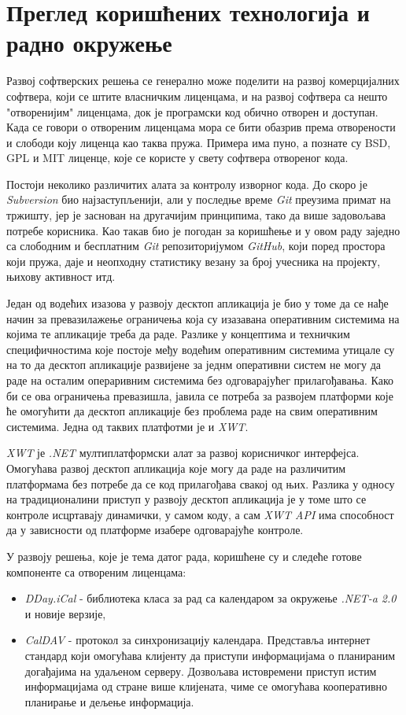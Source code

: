 \chapter{Преглед коришћених технологија и радно окружење}
\label{chap:Pregled koriscenih tehnologija}

Развој софтверских решења се генерално може поделити на развој комерцијалних софтвера, који се штите власничким лиценцама, и на развој софтвера са нешто "отворенијим" лиценцама, док је програмски код обично отворен и доступан. Када се говори о отвореним лиценцама мора се бити обазрив према отворености и слободи коју лиценца као таква пружа. Примера има пуно, а познате су BSD, GPL и MIT\cite{licence} лиценце, које се користе у свету софтвера отвореног кода.

Постоји неколико различитих алата за контролу изворног кода. До скоро је \textit{Subversion} био најзаступљенији, али у последње време \textit{Git} преузима примат на тржишту, јер је заснован на другачијим принципима, тако да више задовољава потребе корисника. Као такав био је погодан за коришћење и у овом раду заједно са слободним и бесплатним \textit{Git} репозиторијумом \textit{GitHub}, који поред простора који пружа, даје и неопходну статистику везану за број учесника на пројекту, њихову активност итд.

Један од водећих изазова у развоју десктоп апликација је био у томе да се нађе начин за превазилажење ограничења која су изазавана оперативним системима на којима те апликације треба да раде. Разлике у концептима и техничким специфичностима које постоје међу водећим оперативним системима утицале су на то да десктоп апликације развијене за једнм оперативни систем не могу да раде на осталим операривним системима без одговарајућег прилагођавања. Како би се ова ограничења превазишла, јавила се потреба за развојем платформи које ће омогућити да десктоп апликације без проблема раде на свим оперативним системима. Једна од таквих платфотми је и \textit{XWT}\cite{xwt}.

\textit{XWT} је \textit{.NET} мултиплатформски алат за развој корисничког интерфејса. Омогућава развој десктоп апликација које могу да раде на различитим платформама без потребе да се код прилагођава свакој од њих. Разлика у односу на традиционалини приступ у развоју десктоп апликација је у томе што се контроле исцртавају динамички, у самом коду, а сам \textit{XWT API} има способност да у зависности од платформе изабере одговарајуће контроле.

У развоју решења, које је тема датог рада, коришћене су и следеће готове компоненте са отвореним лиценцама:
\begin{itemize}
	\item {\textit{DDay.iCal}\cite{dday} - библиотека класа за рад са календаром за окружење \textit{.NET-a 2.0} и новије верзије},
	\item {\textit{CalDAV}\cite{caldav} - протокол за синхронизацију календара. Представља интернет стандард који омогућава клијенту да приступи информацијама о планираним догађајима на удаљеном серверу. Дозвољава истовремени приступ истим информацијама од стране више клијената, чиме се омогућава кооперативно планирање и дељење информација}.
\end{itemize}
